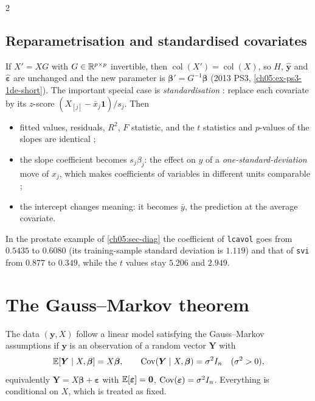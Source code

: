 \begin{paracol}{2}
\subsection{Reparametrisation and standardised covariates}\label{ch05:sec-standard}
If $X'=XG$ with $G\in\mathbb{R}^{p\times p}$ invertible, then $\operatorname{col}(X')=\operatorname{col}(X)$, so $H$, $\hat{\bm y}$ and
$\hat{\bm\varepsilon}$ are unchanged and the new parameter is $\bm\beta'=G^{-1}\bm\beta$ (2013 PS3, \cref{ch05:ex-ps3-1de-short}).
The important special case is \emph{standardisation} : replace each covariate by its
$z$-score $(X_{[j]}-\bar x_j\bm 1)/s_j$. Then
\begin{itemize}
  \item fitted values, residuals, $R^2$, $F$ statistic, and the $t$ statistics and $p$-values of the slopes are
        identical ;
  \item the slope coefficient becomes $s_j\beta_j$: the effect on $y$ of a \emph{one-standard-deviation} move
        of $x_j$, which makes coefficients of variables in different units comparable ;
  \item the intercept changes meaning: it becomes $\bar y$, the prediction at the average covariate.
\end{itemize}
In the prostate example of \cref{ch05:sec-diag} the coefficient of \texttt{lcavol} goes from $0.5435$ to
$0.6080$ (its training-sample standard deviation is $1.119$) and that of \texttt{svi} from $0.877$ to
$0.349$, while the $t$ values stay $5.206$ and $2.949$.

\section{The Gauss--Markov theorem}\label{ch05:sec-gm}

\begin{definition}
The data $(\bm y,X)$ follow a linear model satisfying the Gauss--Markov assumptions if $\bm y$ is an
observation of a random vector $\bm Y$ with  
\[
  \mathbb{E}[\bm Y\mid X,\bm\beta]=X\bm\beta,\qquad \operatorname{Cov}(\bm Y\mid X,\bm\beta)=\sigma^2I_n\quad(\sigma^2>0),
\]
equivalently $\bm Y=X\bm\beta+\bm\varepsilon$ with $\mathbb{E}[\bm\varepsilon]=\bm 0$, $\operatorname{Cov}(\bm\varepsilon)=\sigma^2I_n$. Everything is conditional
on $X$, which is treated as fixed.
\end{definition}


\end{paracol}
